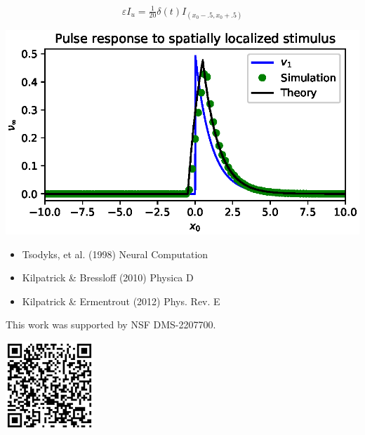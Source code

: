 \documentclass[landscape,final]{baposter}
\begin{document}
\begin{poster}
{\begin{itemize}
		\[
			\varepsilon I_u = \tfrac{1}{20} \delta(t) I_{(x_0 - .5, x_0 + .5)}
		\]
		\begin{center}
			\includegraphics[width=.9\linewidth, trim={0cm, 0cm, 0cm, .2cm}, clip=true]{spatially_localized}
		\end{center}
	\end{itemize}
}

{
\begin{minipage}{.7\textwidth}
	\begin{itemize}
		\item Tsodyks, et al. (1998) Neural Computation
		\item Kilpatrick \& Bressloff (2010) Physica D 
		\item Kilpatrick \& Ermentrout (2012) Phys. Rev. E
	\end{itemize}
This work was supported by NSF DMS-2207700.
\end{minipage}
\begin{minipage}{.25\textwidth}
\includegraphics[width=\linewidth, trim={.7cm, .7cm, .7cm, .7cm}, clip=true]{QR}
\end{minipage}
\bigbreak

}
\end{poster}
\end{document}

